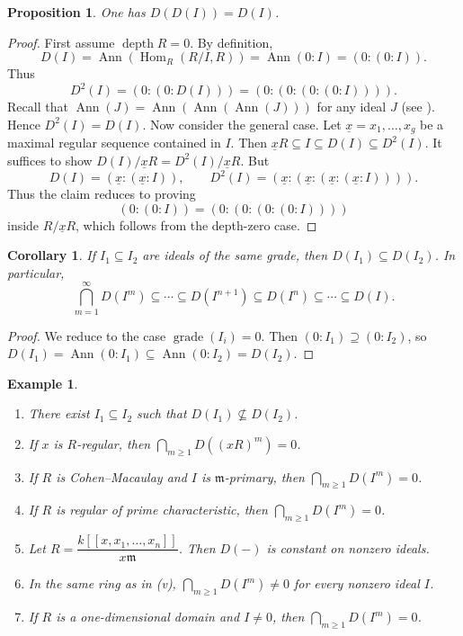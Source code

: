 \documentclass[11pt,a4paper]{amsart}
\numberwithin{equation}{section}
\newtheorem{proposition}[theorem]{Proposition}
\newtheorem{corollary}[theorem]{Corollary}
\newtheorem{example}[theorem]{Example}
\DeclareMathOperator{\grade}{grade}
\DeclareMathOperator{\Ann}{Ann}\DeclareMathOperator{\ann}{Ann}
\DeclareMathOperator{\Hom}{Hom}
\DeclareMathOperator{\depth}{depth}
\newcommand{\fm}{\mathfrak{m}}
\begin{document}
\begin{proposition}\label{d0d}
	One has $D(D(I))=D(I)$.
\end{proposition}

\begin{proof}
	First assume $\depth R=0$. By definition,
	\[
	D(I)=\Ann(\Hom_R(R/I,R))=\Ann(0:I)=(0:(0:I)).
	\]
	Thus
	\[
	D^2(I)=(0:(0:D(I)))=(0:(0:(0:(0:I)))).
	\]
	Recall that $\Ann(J)=\Ann(\Ann(\Ann(J)))$ for any ideal $J$ (see \cite[2.7]{lindo}). Hence $D^2(I)=D(I)$.
Now consider the general case. Let $\underline{x}=x_1,\dots,x_g$ be a maximal regular sequence contained in $I$. Then
	\(
	\underline{x}R \subseteq I \subseteq D(I)\subseteq D^2(I).
	\)
	It suffices to show
	\(
	D(I)/\underline{x}R = D^2(I)/\underline{x}R.
	\)
	But
	\[
	D(I)=(\underline{x}:(\underline{x}:I)), \qquad
	D^2(I)=(\underline{x}:(\underline{x}:(\underline{x}:(\underline{x}:I)))).
	\]
	Thus the claim reduces to proving
	\[
	(0:(0:I)) = (0:(0:(0:(0:I))))
	\]
	inside $R/\underline{x}R$, which follows from the depth-zero case.
\end{proof}

\begin{corollary}\label{perd}
	If $I_1\subseteq I_2$ are ideals of the same grade, then $D(I_1)\subseteq D(I_2)$. In particular,
	\[
	\bigcap_{m=1}^{\infty}D(I^m)\subseteq \cdots \subseteq D(I^{n+1})\subseteq D(I^n)\subseteq \cdots \subseteq D(I).
	\]
\end{corollary}

\begin{proof}
	We reduce to the case $\grade(I_i)=0$. Then $(0:I_1)\supseteq (0:I_2)$, so
	\(
	D(I_1)=\Ann(0:I_1)\subseteq \Ann(0:I_2)=D(I_2).
	\)
\end{proof}

\begin{example}
	\begin{enumerate}
		\item[(i)] There exist $I_1\subseteq I_2$ such that $D(I_1)\nsubseteq D(I_2)$.
		
		\item[(ii)] If $x$ is $R$-regular, then $\bigcap_{m\ge1} D((xR)^m)=0$.
		
		\item[(iii)] If $R$ is Cohen--Macaulay and $I$ is $\fm$-primary, then $\bigcap_{m\ge1} D(I^m)=0$.
		
		\item[(iv)] If $R$ is regular of prime characteristic, then $\bigcap_{m\ge1} D(I^m)=0$.
		
		\item[(v)] Let $R=\dfrac{k[[x,x_1,\dots,x_n]]}{x\fm}$. Then $D(-)$ is constant on nonzero ideals.
		
		\item[(vi)] In the same ring as in (v), $\bigcap_{m\ge1} D(I^m)\ne0$ for every nonzero ideal $I$.
		
		\item[(vii)] If $R$ is a one-dimensional domain and $I\ne0$, then $\bigcap_{m\ge1} D(I^m)=0$.
	\end{enumerate}
\end{example}
\end{document}
